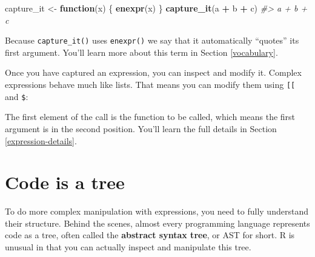 \documentclass[]{book}
\newenvironment{Shaded}{\begin{snugshade}}{\end{snugshade}}
\newcommand{\CommentTok}[1]{\textcolor[rgb]{0.37,0.37,0.37}{\textit{#1}}}
\newcommand{\ControlFlowTok}[1]{\textcolor[rgb]{0.27,0.27,0.27}{\textbf{#1}}}
\newcommand{\DataTypeTok}[1]{\textcolor[rgb]{0.27,0.27,0.27}{#1}}
\newcommand{\DecValTok}[1]{\textcolor[rgb]{0.06,0.06,0.06}{#1}}
\newcommand{\KeywordTok}[1]{\textcolor[rgb]{0.27,0.27,0.27}{\textbf{#1}}}
\newcommand{\NormalTok}[1]{#1}
\newcommand{\OperatorTok}[1]{\textcolor[rgb]{0.43,0.43,0.43}{\textbf{#1}}}
\newcommand{\OtherTok}[1]{\textcolor[rgb]{0.37,0.37,0.37}{#1}}
\newcommand{\StringTok}[1]{\textcolor[rgb]{0.5,0.5,0.5}{#1}}
\begin{document}
\begin{Shaded}
\begin{Highlighting}[]
\NormalTok{capture_it <-}\StringTok{ }\ControlFlowTok{function}\NormalTok{(x) \{}
  \KeywordTok{enexpr}\NormalTok{(x)}
\NormalTok{\}}
\KeywordTok{capture_it}\NormalTok{(a }\OperatorTok{+}\StringTok{ }\NormalTok{b }\OperatorTok{+}\StringTok{ }\NormalTok{c)}
\CommentTok{#> a + b + c}
\end{Highlighting}
\end{Shaded}

Because \texttt{capture\_it()} uses \texttt{enexpr()} we say that it automatically ``quotes'' its first argument. You'll learn more about this term in Section \ref{vocabulary}.

Once you have captured an expression, you can inspect and modify it. Complex expressions behave much like lists. That means you can modify them using \texttt{{[}{[}} and \texttt{\$}:

\begin{Shaded}
\end{Shaded}

The first element of the call is the function to be called, which means the first argument is in the second position. You'll learn the full details in Section \ref{expression-details}.

\hypertarget{code-tree}{%
\section{Code is a tree}\label{code-tree}}

To do more complex manipulation with expressions, you need to fully understand their structure. Behind the scenes, almost every programming language represents code as a tree, often called the \textbf{abstract syntax tree}, or AST for short. R is unusual in that you can actually inspect and manipulate this tree.
\end{document}
